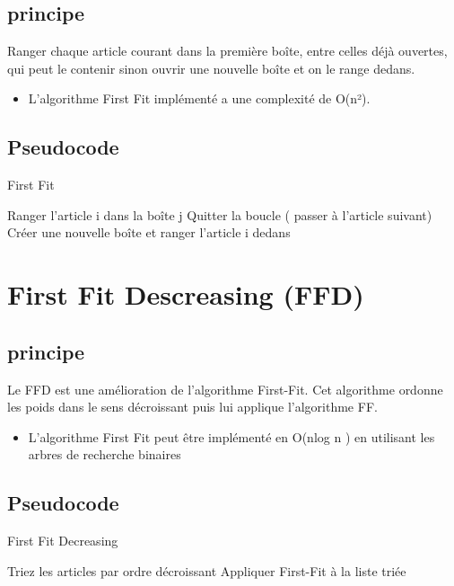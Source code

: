 \documentclass[class=article, crop=false]{standalone}
\begin{document}
\subsection{principe}
Ranger chaque article courant dans la première boîte, entre celles déjà ouvertes, qui peut le contenir sinon ouvrir une nouvelle boîte et on le range dedans.
\begin{itemize}
    \item L’algorithme First Fit implémenté a une complexité de O(n²). 
\end{itemize}

\subsection{Pseudocode}
\begin{algorithm}[!h]
    \caption{First Fit}
    \begin{algorithmic}
              \STATE Ranger l’article i dans la boîte j\;
              \STATE Quitter la boucle ( passer à l'article suivant)\;
             \ENDIF 
        \ENDFOR
            \STATE Créer une nouvelle boîte et ranger l’article i dedans\;
        \ENDIF
    \ENDFOR
    \end{algorithmic}
\end{algorithm}

\section{First Fit Descreasing (FFD)}
\subsection{principe}
Le FFD est une amélioration de l’algorithme First-Fit. Cet algorithme ordonne les poids dans le sens décroissant puis lui applique l’algorithme FF.
\begin{itemize}
    \item L’algorithme First Fit peut être implémenté en O(nlog n ) en utilisant les arbres de recherche binaires 
\end{itemize}

\subsection{Pseudocode}
\begin{algorithm}[!h]
    \caption{First Fit Decreasing }
    \begin{algorithmic}
        \STATE Triez les articles par ordre décroissant\;
        \STATE Appliquer First-Fit à la liste triée \;
    \end{algorithmic}
\end{algorithm}
\end{document}
